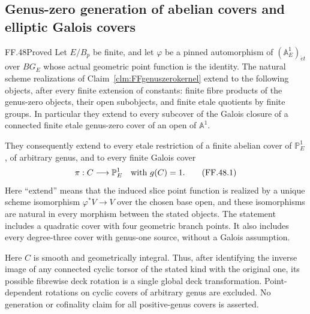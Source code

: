 \subsection{Genus-zero generation of abelian covers and elliptic Galois covers}

\begin{claim}{FF.48}{Proved}\label{clm:FFlatteskernel}
Let \(E/B_p\) be finite, and let \(\varphi\) be a pinned
automorphism of \((\mathbb A^1_E)_{\acute et}\) over \(BG_E\)
whose actual geometric point function is the identity.
The natural scheme realizations of
Claim~\ref{clm:FFgenuszerokernel} extend to the following
objects, after every finite extension of constants:
finite fibre products of the genus-zero objects, their
open subobjects, and finite etale quotients by finite
groups. In particular they extend to every subcover of
the Galois closure of a connected finite etale
genus-zero cover of an open of \(\mathbb A^1\).

They consequently extend to every etale restriction of
a finite abelian cover of \(\mathbb P^1_E\), of
arbitrary genus, and to every finite Galois cover
\[
                  \pi:C\longrightarrow\mathbb P^1_E
       \quad\hbox{with }g(C)=1.
                                                        \tag{FF.48.1}
\]
Here ``extend'' means that the induced slice point
function is realized by a unique scheme isomorphism
\(\varphi^*V\to V\) over the chosen base open, and
these isomorphisms are natural in every morphism between
the stated objects. The statement includes a quadratic
cover with four geometric branch points. It also
includes every degree-three cover with genus-one
source, without a Galois assumption.

Here \(C\) is smooth and geometrically integral.
Thus, after identifying the inverse image of any
connected cyclic torsor of the stated kind with the
original one, its possible fibrewise deck rotation is
a single global deck transformation. Point-dependent
rotations on cyclic covers of arbitrary genus are
excluded. No generation or cofinality
claim for all positive-genus covers is asserted.
\end{claim}

